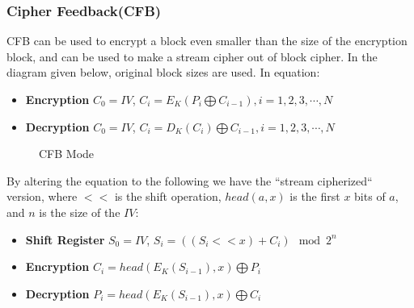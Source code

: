 \documentclass{report}
\begin{document}
			\subsubsection{Cipher Feedback(CFB)}
				CFB can be used to encrypt a block even smaller than the size of the encryption block, and can be used to make a stream cipher out of block cipher. In the diagram given below, original block sizes are used. In equation:
				\begin{itemize}
					\item \textbf{Encryption} $C_0=IV$, $C_i=E_K(P_i \bigoplus C_{i-1}), i=1,2,3,\cdots,N$
					\item \textbf{Decryption} $C_0=IV$, $C_i=D_K(C_i) \bigoplus C_{i-1}, i=1,2,3,\cdots,N$
				\end{itemize}
				\begin{figure}[h!]
					\centering
					 \label{fig-CFB-ENC}
					\qquad
					 \label{fig-CFB-DEC}
					\caption{CFB Mode}
					\label{fig-CFB}
				\end{figure}
				By altering the equation to the following we have the ``stream cipherized`` version, where $<<$ is the shift operation, $head(a,x)$ is the first $x$ bits of $a$, and $n$ is the size of the $IV$:
				\begin{itemize}
					\item \textbf{Shift Register} $S_0=IV$, $S_i=((S_i<<x)+C_i) \mod 2^n$
					\item \textbf{Encryption} $C_i=head(E_K(S_{i-1}),x) \bigoplus P_i$
					\item \textbf{Decryption} $P_i=head(E_K(S_{i-1}),x) \bigoplus C_i$
				\end{itemize}
\end{document}
